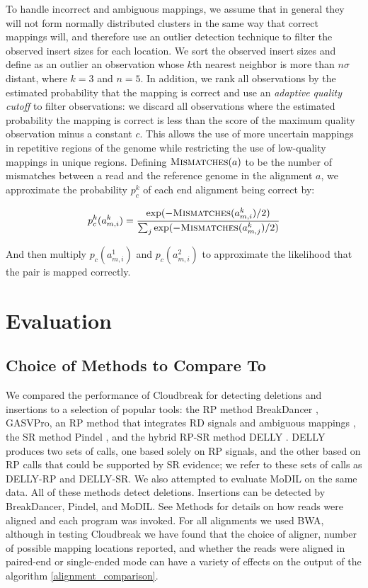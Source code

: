 To handle incorrect and ambiguous mappings, we assume that in general they will not form normally distributed clusters in the same way that correct mappings will, and therefore use an outlier detection technique to filter the observed insert sizes for each location. We sort the observed insert sizes and define as an outlier an observation whose $k$th nearest neighbor is more than $n\sigma$ distant, where $k = 3$ and $n = 5$. In addition, we rank all observations by the estimated probability that the mapping is correct and use an \emph{adaptive quality cutoff} to filter observations: we discard all observations where the estimated probability the mapping is correct is less than the score of the maximum quality observation minus a constant $c$. This allows the use of more uncertain mappings in repetitive regions of the genome while restricting the use of low-quality mappings in unique regions. Defining $\textsc{Mismatches}(a)$ to be the number of mismatches between a read and the reference genome in the alignment $a$, we approximate the probability $p^{k}_c$ of each end alignment being correct by:

\[ p^{k}_c(a^{k}_{m,i}) = \frac{\exp({-\textsc{Mismatches}(a^{k}_{m,i})/2)}}{\sum_j{\exp(-\textsc{Mismatches}(a^{k}_{m,j})/2)}} \]

And then multiply $p_c(a^{1}_{m,i})$ and $p_c(a^{2}_{m,i})$ to approximate the likelihood that the pair is mapped correctly.

% 
\section{Evaluation}


\subsection{Choice of Methods to Compare To}

We compared the performance of Cloudbreak for detecting deletions and insertions to a selection of popular tools: the RP method BreakDancer \cite{Chen:2009p3}, GASVPro, an RP method that integrates RD signals and ambiguous mappings \cite{Sindi:2012kk}, the SR method Pindel \cite{Ye:2009p2}, and the hybrid RP-SR method DELLY \cite{Rausch:2012he}. DELLY produces two sets of calls, one based solely on RP signals, and the other based on RP calls that could be supported by SR evidence; we refer to these sets of calls as DELLY-RP and DELLY-SR. We also attempted to evaluate MoDIL on the same data. All of these methods detect deletions. Insertions can be detected by BreakDancer, Pindel, and MoDIL. See Methods for details on how reads were aligned and each program was invoked. For all alignments we used BWA, although in testing Cloudbreak we have found that the choice of aligner, number of possible mapping locations reported, and whether the reads were aligned in paired-end or single-ended mode can have a variety of effects on the output of the algorithm \ref{alignment_comparison}.

